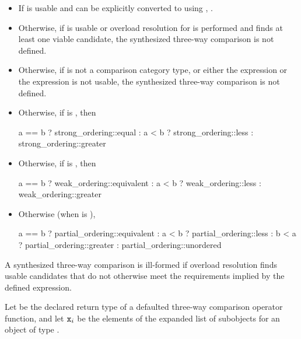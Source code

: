 \begin{itemize}
\item
If  is usable and
can be explicitly converted to  using ,
.

\item
Otherwise, if  is usable or
overload resolution for  is performed and
finds at least one viable candidate,
the synthesized three-way comparison is not defined.

\item
Otherwise, if  is not a comparison category type, or either
the expression  or the expression 
is not usable,
the synthesized three-way comparison is not defined.

\item
Otherwise, if  is , then
\begin{codeblock}
a == b ? strong_ordering::equal :
a < b  ? strong_ordering::less :
         strong_ordering::greater
\end{codeblock}

\item
Otherwise, if  is , then
\begin{codeblock}
a == b ? weak_ordering::equivalent :
a < b  ? weak_ordering::less :
         weak_ordering::greater
\end{codeblock}

\item
Otherwise (when  is ),
\begin{codeblock}
a == b ? partial_ordering::equivalent :
a < b  ? partial_ordering::less :
b < a  ? partial_ordering::greater :
         partial_ordering::unordered
\end{codeblock}
\end{itemize}

\begin{note}
A synthesized three-way comparison is ill-formed
if overload resolution finds usable candidates
that do not otherwise meet the requirements implied by the defined expression.
\end{note}

\pnum
Let  be the declared return type of
a defaulted three-way comparison operator function, and
let $\tcode{x}_i$ be the elements of
the expanded list of subobjects for
an object  of type .

